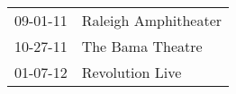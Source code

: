 \begin{supertabular}{p{0.07\textwidth}p{0.23\textwidth}}
 09-01-11 &  Raleigh Amphitheater \\
 10-27-11 &      The Bama Theatre \\
 01-07-12 &       Revolution Live \\
\end{supertabular}
